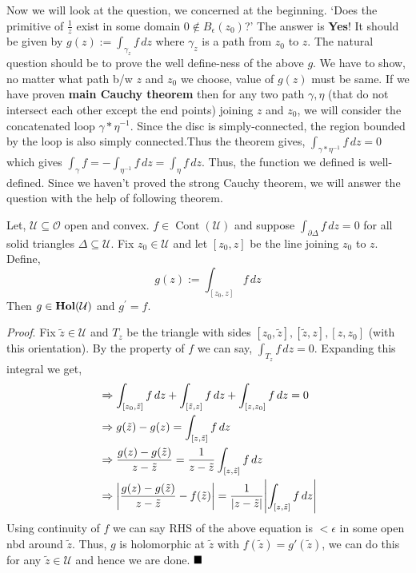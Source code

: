 \documentclass[../ComplexAnalysis_Notes.tex]{subfiles}
\begin{document}
\vspace*{0.1cm}

\noindent Now we will look at the question, we concerned at the beginning. `Does the primitive of $\frac{1}{z}$ exist in some domain $0 \notin B_{\epsilon}(z_0)$?' The answer is \textbf{Yes}! It should be given by $g(z) := \int_{\gamma_z} f\, dz$ where $\gamma_z$ is a path from $z_0$ to $z$.  The natural question should be to prove the well define-ness of the above $g$. We have to show, no matter what path b/w $z$ and $z_0$ we choose, value of $g(z)$ must be same. If we have proven \textbf{main Cauchy theorem} then for any two path $\gamma,\eta$ (that do not intersect each other except the end points) joining $z$ and $z_0$, we will consider the concatenated loop $\gamma \ast \eta^{-1}$. Since the disc is simply-connected, the region bounded by the loop is also simply connected.Thus the theorem gives, $\int_{\gamma \ast \eta^{-1}} f \, dz =0$ which gives $\int_{\gamma} f = - \int_{\eta^{-1}} f\, dz = \int_{\eta} f\, dz$. Thus, the function we defined is well-defined. Since we haven't proved the strong Cauchy theorem, we will answer the question with the help of following theorem. 

\begin{Thm}{}{}\label{thm:4.2}
    \hspace*{0.1cm} Let, $\mathcal{U} \subseteq \mathcal{O}$ open and convex.  $f \in \operatorname{Cont}(\mathcal{U})$ and suppose $\int_{\partial\Delta} f \, dz =0$ for all solid triangles $\Delta \subseteq \mathcal{U}$. Fix $z_0 \in \mathcal{U}$ and let $[z_0,z]$ be the line joining $z_0$ to $z$.  Define, \[g(z):= \int_{[z_0,z]}f\, dz \]
    Then $g \in \operatorname{\mathbf{Hol}} (\mathcal{U})$ and $g^{\prime} =f$.
\end{Thm}

\noindent \textit{Proof}. Fix $\tilde{z} \in \mathcal{U}$ and $T_{z}$ be the triangle with sides $[z_0,\tilde{z}],[\tilde{z},z], [z,z_0]$ (with this orientation). By the property of $f$ we can say, $\int_{T_z} f\, dz =0$. Expanding this integral we get, \begin{align*}
    & \Rightarrow \int_{[z_0,\tilde{z}]} f \, dz + \int_{[\tilde{z},z]} f \, dz + \int_{[z,z_0]} f \, dz =0 \\
    & \Rightarrow g(\tilde{z}) -g(z) =  \int_{[z,\tilde{z}]} f \, dz  \\
    &\Rightarrow \frac{g(z)-g(\tilde{z})}{z-\tilde{z}} = \frac{1}{z-\tilde{z}}  \int_{[z,\tilde{z}]} f \, dz  \\
    &\Rightarrow \abs{\frac{g(z)-g(\tilde{z})}{z-\tilde{z}}-f(\tilde{z})} =   \frac{1}{\abs{z-\tilde{z}}}\abs{\int_{[z,\tilde{z}]} f \, dz} 
\end{align*}
Using continuity of $f$ we can say RHS of the above equation is $<\epsilon$ in some open nbd around $\tilde{z}$. Thus, $g$ is holomorphic at $\tilde{z}$ with $f(\tilde{z})=g'(\tilde{z})$, we can do this for any $\tilde{z} \in \mathcal{U}$ and hence we are done. $\hfill \blacksquare$
\end{document}
